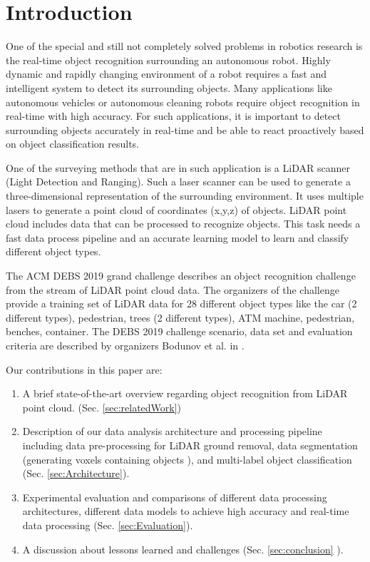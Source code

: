 \documentclass[sigconf]{acmart}
\begin{document}
\section{Introduction}
One of the special and still not completely solved problems in robotics research is the real-time object recognition surrounding an autonomous robot. Highly dynamic and rapidly changing environment of a robot requires a fast and intelligent system to detect its surrounding objects. Many applications like autonomous vehicles or autonomous cleaning robots require object recognition in real-time with high accuracy.
For such applications, it is important to detect surrounding objects accurately in real-time and be able to react proactively based on object classification results.

One of the surveying methods that are in such application is a LiDAR scanner (Light Detection and Ranging). Such a laser scanner can be used to generate a three-dimensional representation of the surrounding environment.
It uses multiple lasers to generate a point cloud of coordinates (x,y,z) of objects.
LiDAR point cloud includes data that can be processed to recognize objects. This task needs a fast data process pipeline and an accurate learning model to learn and classify different object types.

The ACM DEBS 2019 grand challenge \cite{DEBSGC2019} describes an object recognition challenge from the stream of LiDAR point cloud data.
The organizers of the challenge provide a training set of LiDAR data for 28 different object types like the car (2 different types), pedestrian, trees (2 different types), ATM machine, pedestrian, benches, container. The DEBS 2019 challenge scenario, data set and evaluation criteria are described by organizers Bodunov et al. in \cite{DEBSGC2019}.


Our contributions in this paper are:


\begin{enumerate}
  \item A brief state-of-the-art overview regarding object recognition from LiDAR point cloud.  (Sec. \ref{sec:relatedWork})
  \item Description of our data analysis architecture and processing pipeline including data pre-processing for LiDAR ground removal, data segmentation (generating voxels containing objects ), and multi-label object classification  (Sec.  \ref{sec:Architecture}).
  \item Experimental evaluation and comparisons of different data processing architectures, different data models to achieve high accuracy
  and real-time data processing (Sec. \ref{sec:Evaluation}).
  \item A discussion about lessons learned and challenges (Sec. \ref{sec:conclusion} ).
\end{enumerate}
\end{document}
